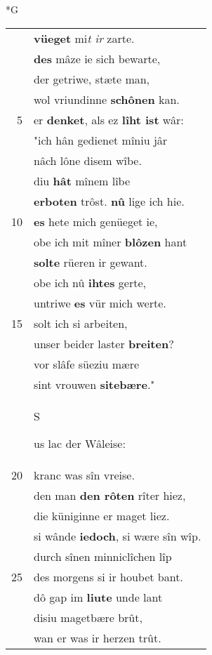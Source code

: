 \documentclass[8pt,a4paper,notitlepage]{article}
\begin{document}
\begin{table}[ht]
\begin{minipage}[t]{0.5\linewidth}
\small
\begin{center}*G
\end{center}
\begin{tabular}{rl}
 & \textbf{vüeget} mi\textit{t ir} zarte.\\ 
 & \textbf{des} mâze ie sich bewarte,\\ 
 & der getriwe, stæte man,\\ 
 & wol vriundinne \textbf{schônen} kan.\\ 
5 & er \textbf{denket}, als ez \textbf{lîht ist} wâr:\\ 
 & "ich hân gedienet mîniu jâr\\ 
 & nâch lône disem wîbe.\\ 
 & diu \textbf{hât} mînem lîbe\\ 
 & \textbf{erboten} trôst. \textbf{nû} lige ich hie.\\ 
10 & \textbf{es} hete mich genüeget ie,\\ 
 & obe ich mit mîner \textbf{blôzen} hant\\ 
 & \textbf{solte} rüeren ir gewant.\\ 
 & obe ich nû \textbf{ihtes} gerte,\\ 
 & untriwe \textbf{es} vür mich werte.\\ 
15 & solt ich si arbeiten,\\ 
 & unser beider laster \textbf{breiten}?\\ 
 & vor slâfe süeziu mære\\ 
 & sint vrouwen \textbf{sitebære}."\\ 
 & \begin{large}S\end{large}us lac der Wâleise:\\ 
20 & kranc was sîn vreise.\\ 
 & den man \textbf{den rôten} rîter hiez,\\ 
 & die küniginne er maget liez.\\ 
 & si wânde \textbf{iedoch}, si wære sîn wîp.\\ 
 & durch sînen minniclîchen lîp\\ 
25 & des morgens si ir houbet bant.\\ 
 & dô gap im \textbf{liute} unde lant\\ 
 & disiu magetbære brût,\\ 
 & wan er was ir herzen trût.\\ 

\end{tabular}
\end{minipage}
\end{table}
\end{document}
